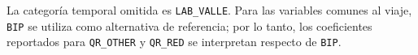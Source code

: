 \begin{landscape}
\begin{longtable}{p{0.16\linewidth} p{0.10\linewidth} p{0.35\linewidth} p{0.18\linewidth} p{0.16\linewidth}}
\end{longtable}
\endgroup
\end{landscape}

\noindent
La categoría temporal omitida es \texttt{LAB\_VALLE}. Para las variables comunes al viaje, \texttt{BIP} se utiliza como alternativa de referencia; por lo tanto, los coeficientes reportados para \texttt{QR\_OTHER} y \texttt{QR\_RED} se interpretan respecto de \texttt{BIP}.
